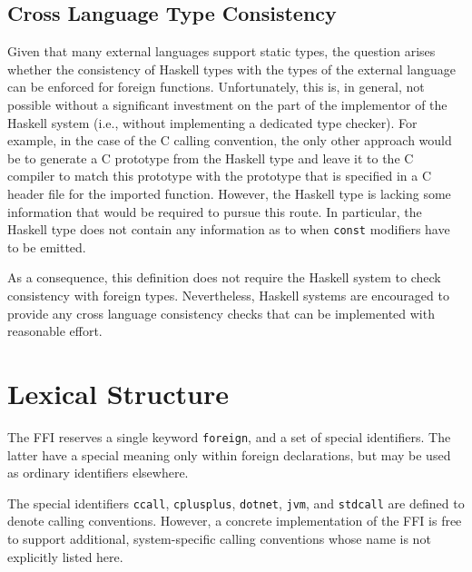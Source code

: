 \subsection{Cross Language Type Consistency}

Given that many external languages support static types, the question arises
whether the consistency of Haskell types with the types of the external
language can be enforced for foreign functions.  Unfortunately, this is, in
general, not possible without a significant investment on the part of the
implementor of the Haskell system (i.e., without implementing a dedicated type
checker).  For example, in the case of the C calling convention, the only
other approach would be to generate a C prototype from the Haskell type and
leave it to the C compiler to match this prototype with the prototype that is
specified in a C header file for the imported function.  However, the Haskell
type is lacking some information that would be required to pursue this route.
In particular, the Haskell type does not contain any information as to when
\mbox{\tt const} modifiers have to be emitted.  

As a consequence, this definition does not require the Haskell system to check
consistency with foreign types.  Nevertheless, Haskell systems are encouraged
to provide any cross language consistency checks that can be implemented with
reasonable effort.

\section{Lexical Structure}

The FFI reserves a single keyword \mbox{\tt foreign}, and a set of special
identifiers.  The latter have a special meaning only within foreign
declarations, but may be used as ordinary identifiers elsewhere.

The special identifiers \mbox{\tt ccall}, \mbox{\tt cplusplus}, \mbox{\tt dotnet},
\mbox{\tt jvm}, and \mbox{\tt stdcall} are defined to denote calling conventions.
However, a concrete implementation of the FFI is free to support additional,
system-specific calling conventions whose name is not explicitly listed here.

